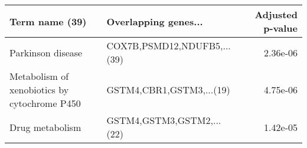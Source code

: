 \begin{tabular}{llr}
\toprule
                              Term name (39) &        Overlapping genes... &  Adjusted p-value \\
\midrule
                           Parkinson disease & COX7B,PSMD12,NDUFB5,...(39) &          2.36e-06 \\
Metabolism of xenobiotics by cytochrome P450 &    GSTM4,CBR1,GSTM3,...(19) &          4.75e-06 \\
                             Drug metabolism &   GSTM4,GSTM3,GSTM2,...(22) &          1.42e-05 \\
\bottomrule
\end{tabular}
